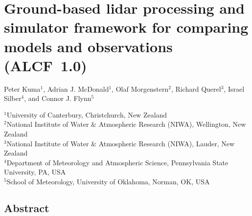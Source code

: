 \chapter{Ground-based lidar processing and simulator framework for comparing models and observations (ALCF~1.0)}

\vspace{-0.1cm}\begin{spacing}{1.2}\sffamily\raggedright
Peter Kuma$^1$, Adrian J. McDonald$^1$, Olaf Morgenstern$^2$, Richard Querel$^3$, Israel Silber$^4$, and Connor J. Flynn$^5$
\end{spacing}

\vspace{0.4cm}\begin{spacing}{1.2}\footnotesize\sffamily\noindent\raggedright
$^1$University of Canterbury, Christchurch, New Zealand\\
$^2$National Institute of Water \& Atmospheric Research (NIWA), Wellington, New Zealand\\
$^3$National Institute of Water \& Atmospheric Research (NIWA), Lauder, New Zealand\\
$^4$Department of Meteorology and Atmospheric Science, Pennsylvania State University, PA, USA\\
$^5$School of Meteorology, University of Oklahoma, Norman, OK, USA
\end{spacing}
\vspace{-0.1cm}

\section*{Abstract}

